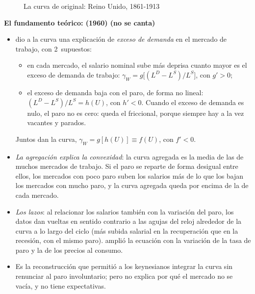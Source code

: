 \documentclass[11pt]{article}
\begin{document}
\begin{figure}[H]
\centering
\caption{La curva de  original: Reino Unido, 1861-1913}\label{fig:phillips-original}
\end{figure}

\begin{anotaciones}
\textbf{El fundamento teórico:  (1960) (no se canta)}
\begin{itemize}
\item \textcite{Lipsey1960Relation} dio a la curva una explicación de \emph{exceso de demanda} en el mercado de trabajo, con 2~supuestos:
  \begin{itemize}
  \item en cada mercado, el salario nominal sube más deprisa cuanto mayor es el exceso de demanda de trabajo: $\gamma_W=g\big[(L^D-L^S)/L^S\big]$, con $g'>0$;
  \item el exceso de demanda baja con el paro, de forma no lineal: $(L^D-L^S)/L^S=h(U)$, con $h'<0$. Cuando el exceso de demanda es nulo, el paro no es cero: queda el friccional, porque siempre hay a la vez vacantes y parados.
  \end{itemize}
  Juntos dan la curva, $\gamma_W=g[h(U)]\equiv f(U)$, con $f'<0$.
\item \emph{La agregación explica la convexidad}: la curva agregada es la media de las de muchos mercados de trabajo. Si el paro se reparte de forma desigual entre ellos, los mercados con poco paro suben los salarios más de lo que los bajan los mercados con mucho paro, y la curva agregada queda por encima de la de cada mercado.
\item \emph{Los lazos}: al relacionar los salarios también con la variación del paro, los datos dan vueltas en sentido contrario a las agujas del reloj alrededor de la curva a lo largo del ciclo (más subida salarial en la recuperación que en la recesión, con el mismo paro).  amplió la ecuación con la variación de la tasa de paro y la de los precios al consumo.
\item Es la reconstrucción que permitió a los keynesianos integrar la curva sin renunciar al paro involuntario; pero no explica por qué el mercado no se vacía, y no tiene expectativas\nocite{DeVroey2016History}.
\end{itemize}
\end{anotaciones}
\end{document}
